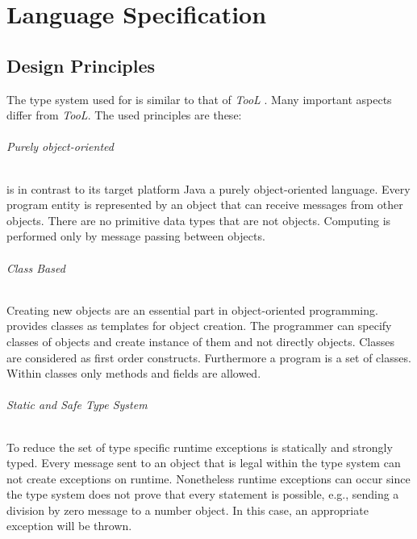 \part{Language Specification}
\chapter{Design Principles}
The type system used for \ooplss is similar to that of \emph{TooL}
\cite{gawecki_tool:_1995}. Many important aspects differ from
\emph{TooL}. The used principles are these:

\paragraph{Purely object-oriented}
\ooplss is in contrast to its target platform Java a purely
object-oriented language. Every program entity is represented by an
object that can receive messages from other objects. There are no
primitive data types that are not objects. Computing is performed only
by message passing between objects.

\paragraph{Class Based}
Creating new objects are an essential part in object-oriented
programming. \ooplss provides classes as templates for object
creation. The programmer can specify classes of objects and create
instance of them and not directly objects. Classes are considered as
first order constructs. Furthermore a program is a set of classes. Within
classes only methods and fields are allowed.

\paragraph{Static and Safe Type System}
To reduce the set of type specific runtime exceptions \ooplss is statically
and strongly typed. Every message sent to an object that is legal within
the type system can not create exceptions on runtime. Nonetheless runtime
exceptions can occur since the type system does not prove that every
statement is possible, e.g., sending a division by zero message to a
number object.  In this case, an appropriate exception will be thrown.


